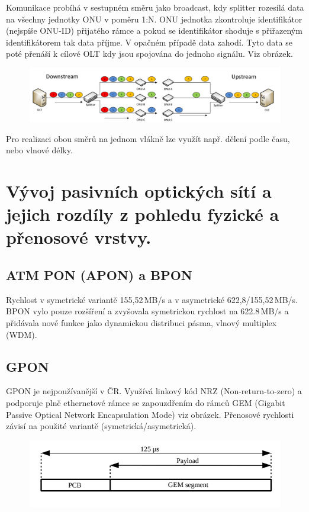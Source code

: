 Komunikace probíhá v sestupném směru jako broadcast, kdy splitter rozesílá data na všechny jednotky ONU v poměru 1:N. ONU jednotka zkontroluje identifikátor (nejspíše ONU-ID) přijatého rámce a pokud se identifikátor shoduje s přiřazeným identifikátorem tak data příjme. V opačném případě data zahodí. Tyto data se poté přenáší k cílové OLT kdy jsou spojována do jednoho signálu. Viz obrázek.

\begin{figure} [h]
    \centering
    \includegraphics[width=\textwidth]{snimky/upDownPON.png}
\end{figure}

Pro realizaci obou směrů na jednom vlákně lze využít např. dělení podle času, nebo vlnové délky.
\clearpage
\section{Vývoj pasivních optických sítí a jejich rozdíly z pohledu fyzické a přenosové vrstvy.}

\subsection{ATM PON (APON) a BPON}
Rychlost v symetrické variantě 155,52\,MB/s a v asymetrické 622,8/155,52\,MB/s. BPON vylo pouze rozšíření a zvyšovala symetrickou rychlost na 622.8\,MB/s a přidávala nové funkce jako dynamickou distribuci pásma, vlnový multiplex (WDM).

\subsection{GPON}
GPON je nejpoužívanější v ČR. Využívá linkový kód NRZ (Non-return-to-zero) a podporuje plně ethernetové rámce se zapouzdřením do rámců GEM (Gigabit Passive Optical Network Encapsulation Mode) viz obrázek. Přenosové rychlosti závisí na použité variantě (symetrická/asymetrická).

\begin{figure} [h]
    \centering
    \includegraphics[width=\textwidth]{snimky/gemFrame.png}
\end{figure}

